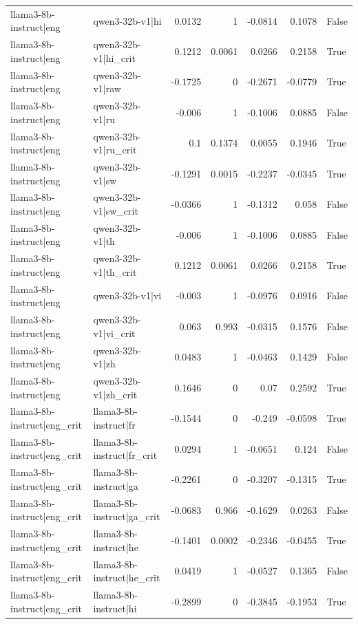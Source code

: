 \begin{table}
\begin{tabular}{l l r r r r l}
llama3-8b-instruct|eng & qwen3-32b-v1|hi & 0.0132 & 1 & -0.0814 & 0.1078 & False \\
llama3-8b-instruct|eng & qwen3-32b-v1|hi_crit & 0.1212 & 0.0061 & 0.0266 & 0.2158 & True \\
llama3-8b-instruct|eng & qwen3-32b-v1|raw & -0.1725 & 0 & -0.2671 & -0.0779 & True \\
llama3-8b-instruct|eng & qwen3-32b-v1|ru & -0.006 & 1 & -0.1006 & 0.0885 & False \\
llama3-8b-instruct|eng & qwen3-32b-v1|ru_crit & 0.1 & 0.1374 & 0.0055 & 0.1946 & True \\
llama3-8b-instruct|eng & qwen3-32b-v1|sw & -0.1291 & 0.0015 & -0.2237 & -0.0345 & True \\
llama3-8b-instruct|eng & qwen3-32b-v1|sw_crit & -0.0366 & 1 & -0.1312 & 0.058 & False \\
llama3-8b-instruct|eng & qwen3-32b-v1|th & -0.006 & 1 & -0.1006 & 0.0885 & False \\
llama3-8b-instruct|eng & qwen3-32b-v1|th_crit & 0.1212 & 0.0061 & 0.0266 & 0.2158 & True \\
llama3-8b-instruct|eng & qwen3-32b-v1|vi & -0.003 & 1 & -0.0976 & 0.0916 & False \\
llama3-8b-instruct|eng & qwen3-32b-v1|vi_crit & 0.063 & 0.993 & -0.0315 & 0.1576 & False \\
llama3-8b-instruct|eng & qwen3-32b-v1|zh & 0.0483 & 1 & -0.0463 & 0.1429 & False \\
llama3-8b-instruct|eng & qwen3-32b-v1|zh_crit & 0.1646 & 0 & 0.07 & 0.2592 & True \\
llama3-8b-instruct|eng_crit & llama3-8b-instruct|fr & -0.1544 & 0 & -0.249 & -0.0598 & True \\
llama3-8b-instruct|eng_crit & llama3-8b-instruct|fr_crit & 0.0294 & 1 & -0.0651 & 0.124 & False \\
llama3-8b-instruct|eng_crit & llama3-8b-instruct|ga & -0.2261 & 0 & -0.3207 & -0.1315 & True \\
llama3-8b-instruct|eng_crit & llama3-8b-instruct|ga_crit & -0.0683 & 0.966 & -0.1629 & 0.0263 & False \\
llama3-8b-instruct|eng_crit & llama3-8b-instruct|he & -0.1401 & 0.0002 & -0.2346 & -0.0455 & True \\
llama3-8b-instruct|eng_crit & llama3-8b-instruct|he_crit & 0.0419 & 1 & -0.0527 & 0.1365 & False \\
llama3-8b-instruct|eng_crit & llama3-8b-instruct|hi & -0.2899 & 0 & -0.3845 & -0.1953 & True \\

\end{tabular}
\end{table}
